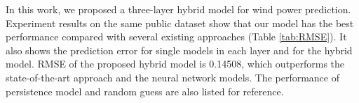 \documentclass[conference]{IEEEtran}
\begin{document}
In this work, we proposed a three-layer hybrid model for wind power prediction. Experiment results on the same public dataset show that our model has the best performance compared with several existing approaches (Table \ref{tab:RMSE}). It also shows the prediction error for single models in each layer and for the hybrid model. RMSE of the proposed hybrid model is 0.14508, which outperforms the state-of-the-art approach and the neural network models. The performance of persistence model and random guess are also listed for reference.

\begin{table}
\caption {Prediction Error in RMSE for Comparison.}
\begin{center}
\end{center}
\end{table}
\end{document}
